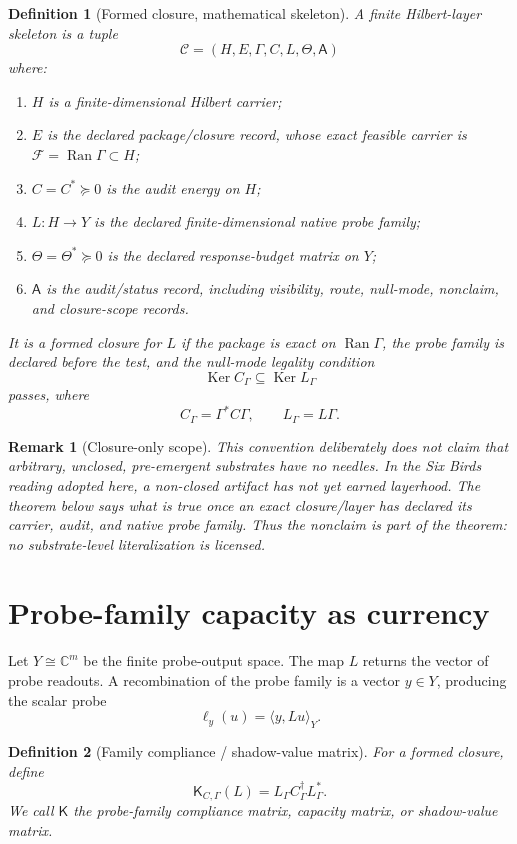 \documentclass[11pt]{article}
\newtheorem{definition}{Definition}
\newtheorem{remark}{Remark}
\newcommand{\C}{\mathbb C}
\newcommand{\Ran}{\operatorname{Ran}}
\newcommand{\Ker}{\operatorname{Ker}}
\begin{document}
\begin{definition}[Formed closure, mathematical skeleton]
A finite Hilbert-layer skeleton is a tuple
\[
        \mathcal C=(H,E,\Gamma,C,L,\Theta,\mathsf A)
\]
where:
\begin{enumerate}[label=(\roman*)]
\item $H$ is a finite-dimensional Hilbert carrier;
\item $E$ is the declared package/closure record, whose exact feasible carrier is $\mathcal F=\Ran\Gamma\subset H$;
\item $C=C^*\succeq0$ is the audit energy on $H$;
\item $L:H\to Y$ is the declared finite-dimensional native probe family;
\item $\Theta=\Theta^*\succeq0$ is the declared response-budget matrix on $Y$;
\item $\mathsf A$ is the audit/status record, including visibility, route, null-mode, nonclaim, and closure-scope records.
\end{enumerate}
It is a \emph{formed closure for $L$} if the package is exact on $\Ran\Gamma$, the probe family is declared before the test, and the null-mode legality condition
\[
        \Ker C_\Gamma\subseteq \Ker L_\Gamma
\]
passes, where
\[
        C_\Gamma=\Gamma^*C\Gamma,\qquad L_\Gamma=L\Gamma.
\]
\end{definition}

\begin{remark}[Closure-only scope]
This convention deliberately does not claim that arbitrary, unclosed, pre-emergent substrates have no needles.  In the Six Birds reading adopted here, a non-closed artifact has not yet earned layerhood.  The theorem below says what is true once an exact closure/layer has declared its carrier, audit, and native probe family.  Thus the nonclaim is part of the theorem: no substrate-level literalization is licensed.
\end{remark}

\section{Probe-family capacity as currency}
Let $Y\cong\C^m$ be the finite probe-output space.  The map $L$ returns the vector of probe readouts.  A recombination of the probe family is a vector $y\in Y$, producing the scalar probe
\[
        \ell_y(u)=\langle y,Lu\rangle_Y.
\]

\begin{definition}[Family compliance / shadow-value matrix]
For a formed closure, define
\[
        \boxed{\mathsf K_{C,\Gamma}(L)=L_\Gamma C_\Gamma^\dagger L_\Gamma^*.}
\]
We call $\mathsf K$ the \emph{probe-family compliance matrix}, \emph{capacity matrix}, or \emph{shadow-value matrix}.
\end{definition}
\end{document}
